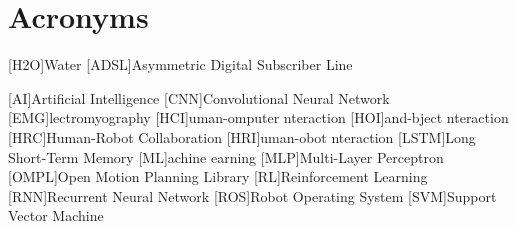 \chapter{Acronyms}

\footnotesize
\SingleSpacing

\begin{acronym}[AAAAAA]

    [H2O]{Water}
    [ADSL]{Asymmetric Digital Subscriber Line}

    [AI]{Artificial Intelligence}
    [CNN]{Convolutional Neural Network}
    [EMG]{lectromyography}
    [HCI]{uman-omputer nteraction}
    [HOI]{and-bject nteraction}
    [HRC]{Human-Robot Collaboration}
    [HRI]{uman-obot nteraction}
    [LSTM]{Long Short-Term Memory}
    [ML]{achine earning}
    [MLP]{Multi-Layer Perceptron} %
    [OMPL]{Open Motion Planning Library} %
    [RL]{Reinforcement Learning}
    [RNN]{Recurrent Neural Network}
    [ROS]{Robot Operating System}
    [SVM]{Support Vector Machine}
\end{acronym}
